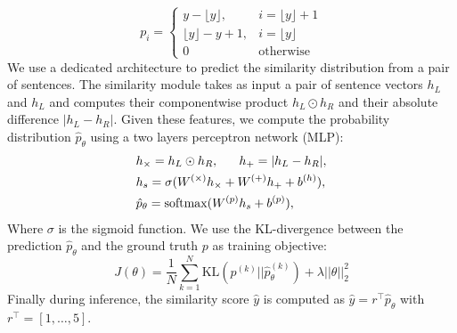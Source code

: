 \begin{equation*}
p_{i} = \left\{
\begin{array}{ll}
y - \lfloor{y}\rfloor, & i = \lfloor{y}\rfloor + 1 \\
\lfloor{y}\rfloor - y + 1, & i = \lfloor{y}\rfloor \\
0 & \text{otherwise}
\end{array} \right.
\end{equation*}
We use a dedicated architecture to predict the similarity distribution from a pair of sentences. The similarity module takes as input a pair of sentence vectors $h_{L} $ and $h_{L}$ and computes their component\-wise product $h_{L} \odot h_{R}$ and their absolute difference $|h_{L} - h_{R}|$. Given these features, we compute the probability distribution  $\hat{p}_{\theta}$ using a two layers perceptron network (MLP):
\begin{align}
\begin{split}
&h_{\times}=h_L\odot h_R, ~~~~~h_{+} = |h_L - h_R |, \\
&h_s = \sigma (W^{(\times)}h_{\times} + W^{(+)}h_{+} + b^{(h)}), \\
&\hat{p}_{\theta} = \operatorname{softmax}(W^{(p)}h_s + b^{(p)}),\\
\end{split}
\end{align}
Where $\sigma$ is the sigmoid function. We use the KL-divergence between the prediction $\hat{p}_{\theta}$ and the ground truth $p$ as training objective:
\begin{equation}
J(\theta) = \frac{1}{N}\sum_{k=1}^{N}\text{KL}(p^{(k)} || \hat{p}_{\theta}^{(k)}) + \lambda||\theta||_{2}^{2}
\end{equation}
Finally during inference, the similarity score $\hat{y}$ is computed as $\hat{y} = r^{\intercal} \hat{p}_{\theta}$ with $r^{\intercal} = [1, \dots, 5]$. 


